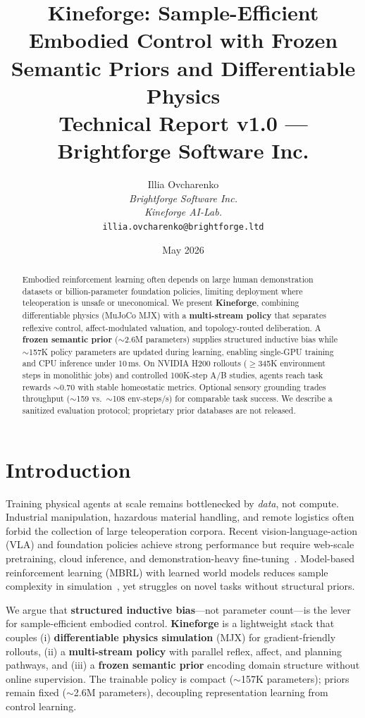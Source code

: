 \documentclass[11pt,a4paper]{article}
\title{\textbf{Kineforge: Sample-Efficient Embodied Control with Frozen Semantic Priors and Differentiable Physics}\\[0.4em]
\large Technical Report v1.0 --- Brightforge Software Inc.}
\author{Illia Ovcharenko \\[0.3em] \textit{Brightforge Software Inc.} \\ \textit{Kineforge AI-Lab.} \\ \texttt{illia.ovcharenko@brightforge.ltd}}
\date{May 2026}
\begin{document}
\maketitle

\begin{abstract}
Embodied reinforcement learning often depends on large human demonstration datasets or billion-parameter foundation policies, limiting deployment where teleoperation is unsafe or uneconomical. We present \textbf{Kineforge}, combining differentiable physics (MuJoCo MJX) with a \textbf{multi-stream policy} that separates reflexive control, affect-modulated valuation, and topology-routed deliberation. A \textbf{frozen semantic prior} (${\sim}$2.6M parameters) supplies structured inductive bias while ${\sim}$157K policy parameters are updated during learning, enabling single-GPU training and CPU inference under 10\,ms. On NVIDIA H200 rollouts (${\ge}$345K environment steps in monolithic jobs) and controlled 100K-step A/B studies, agents reach task rewards ${\sim}$0.70 with stable homeostatic metrics. Optional sensory grounding trades throughput (${\sim}$159 vs.\ ${\sim}$108 env-steps/s) for comparable task success. We describe a sanitized evaluation protocol; proprietary prior databases are not released.
\end{abstract}

\section{Introduction}
\label{sec:intro}

Training physical agents at scale remains bottlenecked by \emph{data}, not compute. Industrial manipulation, hazardous material handling, and remote logistics often forbid the collection of large teleoperation corpora. Recent vision-language-action (VLA) and foundation policies achieve strong performance but require web-scale pretraining, cloud inference, and demonstration-heavy fine-tuning~\cite{brohan2023rt2,ye2024rlfp}. Model-based reinforcement learning (MBRL) with learned world models reduces sample complexity in simulation~\cite{hafner2023dreamerv3}, yet struggles on novel tasks without structural priors.

We argue that \textbf{structured inductive bias}---not parameter count---is the lever for sample-efficient embodied control. \textbf{Kineforge} is a lightweight stack that couples (i) \textbf{differentiable physics simulation} (MJX) for gradient-friendly rollouts, (ii) a \textbf{multi-stream policy} with parallel reflex, affect, and planning pathways, and (iii) a \textbf{frozen semantic prior} encoding domain structure without online supervision. The trainable policy is compact (${\sim}$157K parameters); priors remain fixed (${\sim}$2.6M parameters), decoupling representation learning from control learning.
\end{document}
